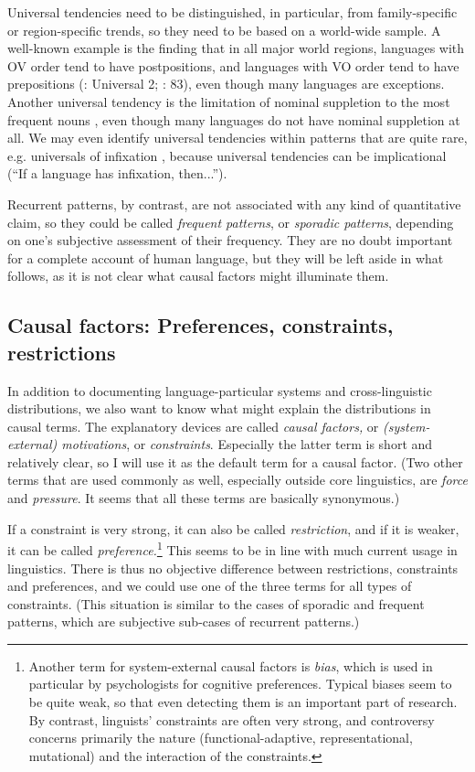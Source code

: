 \documentclass[output=paper]{langsci/langscibook}
\begin{document}
Universal tendencies need to be distinguished, in particular, from family-specific or region-specific trends, so they need to be based on a world-wide sample. A well-known example is the finding that in all major world regions, languages with OV order tend to have postpositions, and languages with VO order tend to have prepositions (\citealt{Greenberg1963}: Universal 2; \citealt{Dryer1992}: 83), even though many languages are exceptions. Another universal tendency is the limitation of nominal suppletion to the most frequent nouns \citep{Vafaeian2013}, even though many languages do not have nominal suppletion at all. We may even identify universal tendencies within patterns that are quite rare, e.g. universals of infixation \citep{Yu2007}, because universal tendencies can be implicational (“If a language has infixation, then...”).

Recurrent patterns, by contrast, are not associated with any kind of quantitative claim, so they could be called \textit{frequent patterns}, or \textit{sporadic patterns}, depending on one’s subjective assessment of their frequency. They are no doubt important for a complete account of human language, but they will be left aside in what follows, as it is not clear what causal factors might illuminate them.

\subsection{Causal factors: Preferences, constraints, restrictions}


In addition to documenting language-particular systems and cross-linguistic distributions, we also want to know what might explain the distributions in causal terms. The explanatory devices are called \textit{causal factors,} or \textit{(system-external) motivations}, or \textit{constraints}. Especially the latter term is short and relatively clear, so I will use it as the default term for a causal factor. (Two other terms that are used commonly as well, especially outside core linguistics, are \textit{force} and \textit{pressure}. It seems that all these terms are basically synonymous.)

If a constraint is very strong, it can also be called \textit{restriction}, and if it is weaker, it can be called \textit{preference.}\footnote{Another term for system-external causal factors is \textit{bias}, which is used in particular by psychologists for cognitive preferences. Typical biases seem to be quite weak, so that even detecting them is an important part of research. By contrast, linguists’ constraints are often very strong, and controversy concerns primarily the nature (functional-adaptive, representational, mutational) and the interaction of the constraints.} This seems to be in line with much current usage in linguistics. There is thus no objective difference between restrictions, constraints and preferences, and we could use one of the three terms for all types of constraints. (This situation is similar to the cases of sporadic and frequent patterns, which are subjective sub-cases of recurrent patterns.)
\end{document}

